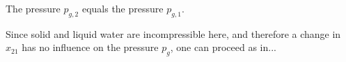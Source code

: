The pressure \( p_{g,2} \) equals the pressure \( p_{g,1} \).

Since solid and liquid water are incompressible here, and therefore a change in \( x_{21} \) has no influence on the pressure \( p_{g} \), one can proceed as in...